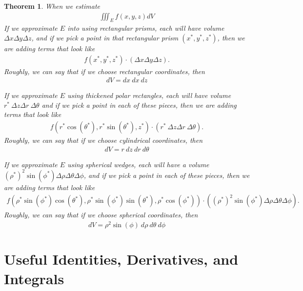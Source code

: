 \documentclass{article}[11pt]
\newtheorem{theorem}{Theorem}[section]
\theoremstyle{definition}
\numberwithin{equation}{section}
\begin{document}
\begin{theorem}
	When we estimate
	\begin{align*}
	\iiint_E f(x,y,z) dV
	\end{align*}
	If we approximate \(E\) into using rectangular prisms, each will have volume \( \Delta x \Delta y \Delta z \), and if we pick a point in that rectangular prism \((x^*,y^*,z^*)\), then we are adding terms that look like
	\begin{align*}
	f(x^*,y^*,z^*)\cdot(  \Delta x \Delta y \Delta z  ).
	\end{align*}
	Roughly, we can say that if we choose rectangular coordinates, then \begin{align}
	dV=dx\:dx\:dz
	\end{align}
	
	
	If we approximate \(E\) using thickened polar rectangles, each will have volume \( r^* \: \Delta z \Delta r \: \Delta \theta  \) and if we pick a point in each of these pieces, then we are adding terms that look like
	\begin{align*}
	f(r^*\cos(\theta^*),r^*\sin(\theta^*),z^*)\cdot(r^* \: \Delta z \Delta r \: \Delta \theta).
	\end{align*}
	Roughly, we can say that if we choose cylindrical coordinates, then \begin{align}
	dV=r\:dz\:dr\:d\theta
	\end{align}
	
	
	If we approximate \(E\) using spherical wedges, each will have a volume \((\rho^*)^2\sin(\phi^*)\Delta\rho \Delta\theta \Delta \phi \), and if we pick a point in each of these pieces, then we are adding terms that look like
	\begin{align*}
	f(\rho^*\sin(\phi^*)\cos(\theta^*),\rho^*\sin(\phi^*)\sin(\theta^*),\rho^*\cos(\phi^*) )\cdot((\rho^*)^2\sin(\phi^*)\Delta\rho \Delta\theta \Delta \phi).
	\end{align*}
	Roughly, we can say that if we choose spherical coordinates, then \begin{align}
	dV=\rho^2\sin(\phi)\:d\rho\:d\theta\:d\phi
	\end{align}
\end{theorem}
\newpage
\section{Useful Identities, Derivatives, and Integrals}
\end{document}

